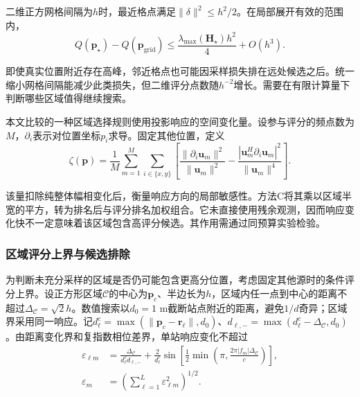 \documentclass[11pt,a4paper]{article}
\numberwithin{equation}{section}
\numberwithin{figure}{section}
\numberwithin{table}{section}
\begin{document}
二维正方网格间隔为$h$时，最近格点满足$\|\delta\|^2\leq h^2/2$。在局部展开有效的范围内，
\begin{equation}\label{eq:2.18}
Q(\mathbf{p}_\star)-Q(\mathbf{p}_{\mathrm{grid}}) \leq\frac{\lambda_{\max}(\mathbf{H}_\star)h^2}{4}+O(h^3).
\end{equation}

即使真实位置附近存在高峰，邻近格点也可能因采样损失排在远处候选之后。统一缩小网格间隔能减少此类损失，但二维评分点数随$h^{-2}$增长。需要在有限计算量下判断哪些区域值得继续搜索。

本文比较的一种区域选择规则使用投影响应的空间变化量。设参与评分的频点数为$M$，$\partial_i$表示对位置坐标$p_i$求导。固定其他位置，定义
\begin{equation}\label{eq:2.19}
\zeta(\mathbf{p}) =\frac{1}{M}\sum_{m=1}^{M}\sum_{i\in\{x,y\}} \left[ \frac{\|\partial_i\mathbf{u}_m\|^2}{\|\mathbf{u}_m\|^2} - \frac{|\mathbf{u}_m^H\partial_i\mathbf{u}_m|^2}{\|\mathbf{u}_m\|^4} \right].
\end{equation}

该量扣除纯整体幅相变化后，衡量响应方向的局部敏感性。方法C将其乘以区域半宽的平方，转为排名后与评分排名加权组合。它未直接使用残余观测，因而响应变化快不一定意味着该区域包含高评分候选。其作用需通过同预算实验检验。

\subsubsection{区域评分上界与候选排除}\label{sec:region-bound}

为判断未充分采样的区域是否仍可能包含更高分位置，考虑固定其他源时的条件评分上界。设正方形区域$\mathcal C$的中心为$\mathbf p_c$、半边长为$h$，区域内任一点到中心的距离不超过$\Delta_{\mathcal C}=\sqrt{2}h$。数值搜索以$d_0=1$ m截断站点附近的距离，避免$1/d$奇异；区域界采用同一响应。记$d_\ell^c=\max(\|\mathbf p_c-\mathbf r_\ell\|,d_0)$、$d_{\ell,-}=\max(d_\ell^c-\Delta_{\mathcal C},d_0)$。由距离变化界和复指数相位差界，单站响应变化不超过
\begin{equation}\label{eq:response-bound}
\begin{aligned}
\varepsilon_{\ell m}
&=\frac{\Delta_{\mathcal C}}{d_\ell^c d_{\ell,-}}
+\frac{2}{d_\ell^c}\sin\!\left[\frac12\min\!\left(\pi,\frac{2\pi|f_m|\Delta_{\mathcal C}}{c}\right)\right],\\
\varepsilon_m&=\left(\sum_{\ell=1}^{L}\varepsilon_{\ell m}^2\right)^{1/2}.
\end{aligned}
\end{equation}
\end{document}
